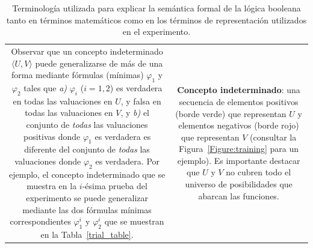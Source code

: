 \begin{table}[]
\begin{tabular}{c|c}
\begin{minipage}[t]{0.45\textwidth}
Observar que un concepto indeterminado $ \langle U, V \rangle $ puede generalizarse de más de una forma mediante fórmulas (mínimas) $ \varphi_1 $ y $ \varphi_2 $ tales que {\em a)} $ \varphi_i $ ($ i = 1,2 $) es verdadera en todas las valuaciones en $ U $, y falsa en todas las valuaciones en $ V $, y {\em b)} el conjunto de {\em todas} las valuaciones positivas donde $ \varphi_1 $ es verdadera es diferente del conjunto de {\em todas} las valuaciones donde $ \varphi_2 $ es verdadera. Por ejemplo, el concepto indeterminado que se muestra en la $ i $-ésima prueba del experimento se puede generalizar mediante las dos fórmulas mínimas correspondientes $ \varphi^i_1 $ y $ \varphi^i_2 $ que se muestran en la Tabla~\ref{trial_table}.
\end{minipage}
&
\begin{minipage}[t]{0.45\textwidth}
{\bf Concepto indeterminado}: una secuencia de elementos positivos (borde verde) que representan $ U $ y elementos negativos (borde rojo) que representan $ V $ (consultar la Figura~\ref{Figure:training} para un ejemplo). Es importante destacar que $ U $ y $ V $ no cubren todo el universo de posibilidades que abarcan las funciones.\end{minipage}
\end{tabular}
\caption {Terminología utilizada para explicar la semántica formal de la lógica booleana tanto en términos matemáticos como en los términos de representación utilizados en el experimento.}
\label{tab:glosario}
\end{table}




